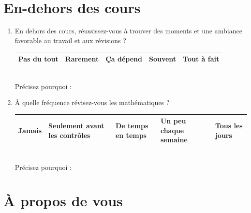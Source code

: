 \documentclass[oneside,12pt]{article}          %
\begin{document}
\section{En-dehors des cours}

\begin{enumerate}[itemsep=5mm]

	\item En dehors des cours, réussissez-vous à trouver des moments et une ambiance favorable au travail et aux révisions ?
	
		\hspace{\linewidth-\textwidth}
		\renewcommand{\arraystretch}{1.5}
		\begin{tabular}{| P{0.175\textwidth} | P{0.175\textwidth} | P{0.175\textwidth} | P{0.175\textwidth} | P{0.175\textwidth} |} \hline
			Pas du tout & Rarement & Ça dépend & Souvent & Tout à fait \\ \hline
		\end{tabular} \\
		
		\hspace{\linewidth-\textwidth} Précisez pourquoi : 



	\item À quelle fréquence révisez-vous les mathématiques ?
	
		\hspace{\linewidth-\textwidth}
		\renewcommand{\arraystretch}{1.5}
		\begin{tabular}{| P{0.175\textwidth} | P{0.175\textwidth} | P{0.175\textwidth} | P{0.175\textwidth} | P{0.175\textwidth} |} \hline
			Jamais & Seulement avant les contrôles & De temps en temps & Un peu chaque semaine & Tous les jours \\ \hline
		\end{tabular} \\
		
		\hspace{\linewidth-\textwidth} Précisez pourquoi : 
				
\end{enumerate}



\section{À propos de vous}
\end{document}
